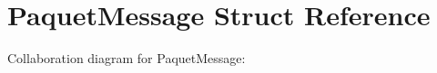 \hypertarget{structPaquetMessage}{}\section{Paquet\+Message Struct Reference}
\label{structPaquetMessage}


Collaboration diagram for Paquet\+Message\+:
